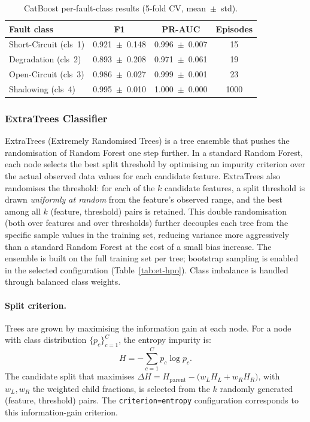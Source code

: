 \begin{table}[H]
\centering
\caption{CatBoost per-fault-class results (5-fold CV, mean~$\pm$~std).\label{tab:cat-per-class}}
\begin{tabular}{lccc}
\toprule
\textbf{Fault class} & \textbf{F1} & \textbf{PR-AUC} & \textbf{Episodes} \\
\midrule
Short-Circuit (cls~1) & 0.921~$\pm$~0.148 & 0.996~$\pm$~0.007 & 15 \\
Degradation   (cls~2) & 0.893~$\pm$~0.208 & 0.971~$\pm$~0.061 & 19 \\
Open-Circuit  (cls~3) & 0.986~$\pm$~0.027 & 0.999~$\pm$~0.001 & 23 \\
Shadowing     (cls~4) & 0.995~$\pm$~0.010 & 1.000~$\pm$~0.000 & 1000 \\
\bottomrule
\end{tabular}
\end{table}

\subsubsection{ExtraTrees Classifier}

ExtraTrees (Extremely Randomised Trees) is a tree ensemble that pushes the randomisation of Random Forest one step further. In a standard Random Forest, each node selects the best split threshold by optimising an impurity criterion over the actual observed data values for each candidate feature. ExtraTrees also randomises the threshold: for each of the $k$ candidate features, a split threshold is drawn \emph{uniformly at random} from the feature's observed range, and the best among all $k$ (feature, threshold) pairs is retained. This double randomisation (both over features and over thresholds) further decouples each tree from the specific sample values in the training set, reducing variance more aggressively than a standard Random Forest at the cost of a small bias increase. The ensemble is built on the full training set per tree; bootstrap sampling is enabled in the selected configuration (Table~\ref{tab:et-hpo}). Class imbalance is handled through balanced class weights.

\paragraph{Split criterion.}
Trees are grown by maximising the information gain at each node. For a node with class distribution $\{p_c\}_{c=1}^{C}$, the entropy impurity is:
\begin{equation}
    H = -\sum_{c=1}^{C} p_c \log p_c.
\end{equation}
The candidate split that maximises $\Delta H = H_{\text{parent}} - \bigl(w_L H_L + w_R H_R\bigr)$, with $w_L, w_R$ the weighted child fractions, is selected from the $k$ randomly generated (feature, threshold) pairs. The \texttt{criterion=entropy} configuration corresponds to this information-gain criterion.

